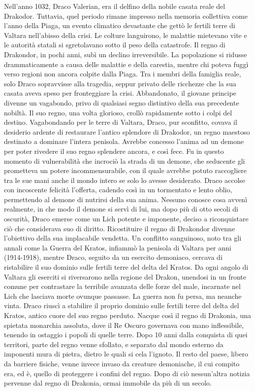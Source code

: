 Nell'anno 1032, Draco Valerian, era il delfino della nobile casata reale
del Drakodor. Tuttavia, quel periodo rimane impresso nella memoria
collettiva come l'anno della Piaga, un evento climatico devastante che
gettò le fertili terre di Valtara nell'abisso della crisi. Le colture
languirono, le malattie mietevano vite e le autorità statali si
sgretolavano sotto il peso della catastrofe. Il regno di Drakondor, in
pochi anni, subì un declino irreversibile. La popolazione si ridusse
drammaticamente a causa delle malattie e della carestia, mentre chi
poteva fuggì verso regioni non ancora colpite dalla Piaga. Tra i membri
della famiglia reale, solo Draco sopravvisse alla tragedia, seppur
privato delle ricchezze che la sua casata aveva speso per fronteggiare
la crisi. Abbandonato, il giovane principe divenne un vagabondo, privo
di qualsiasi segno distintivo della sua precedente nobiltà. Il suo
regno, una volta glorioso, crollò rapidamente sotto i colpi del destino.
Vagabondando per le terre di Valtara, Draco, pur sconfitto, covava il
desiderio ardente di restaurare l'antico splendore di Drakodor, un regno
maestoso destinato a dominare l'intera penisola. Avrebbe concesso
l'anima ad un demone per poter rivedere il suo regno splendere ancora, e
così fece. Fu in questo momento di vulnerabilità che incrociò la strada
di un demone, che seducente gli prometteva un potere incommensurabile,
con il quale avrebbe potuto raccogliere tra le sue mani anche il mondo
intero se solo lo avesse desiderato. Draco accolse con incoscente
felicità l'offerta, cadendo così in un tormentato e lento oblio,
permettendo al demone di nutrirsi della sua anima. Nessuno conosce cosa
avvenì realmente, in che modo il demone si servì di lui, ma dopo più di
otto secoli di oscurità, Draco emerse come un Lich potente e imponente,
deciso a riconquistare ciò che considerava suo di diritto. Ricostituire
il regno di Drakondor divenne l'obiettivo della sua implacabile
vendetta. Un conflitto sanguinoso, noto tra gli annali come la Guerra
del Kratos, infiammò la penisola di Valtara per anni (1914-1918), mentre
Draco, seguito da un esercito demoniaco, cercava di ristabilire il suo
dominio sulle fertili terre del delta del Kratos. Da ogni angolo di
Valtara gli eserciti si riversarono nella regione del Drakon, unendosi
in un fronte comune per contrastare la terribile avanzata delle forze
del male, incarnate nel Lich che lasciava morte ovunque passasse. La
guerra non fu persa, ma neanche vinta. Draco riuscì a stabilire il
proprio dominio sulle fertili terre del delta del Kratos, antico cuore
del suo regno perduto. Nacque così il regno di Drakonia, una spietata
monarchia assoluta, dove il Re Oscuro governava con mano inflessibile,
tenendo in ostaggio i popoli di quelle terre. Dopo 10 anni dalla
conquista di quei territori, parte del regno venne sfollato, e separato
dal mondo esterno da imponenti mura di pietra, dietro le quali si cela
l'ignoto. Il resto del paese, libero da barriere fisiche, venne invece
invaso da creature demoniache, il cui compito era, ed è, quello di
proteggere i confini del regno. Dopo di ciò nessun'altra notizia
pervenne dal regno di Drakonia, ormai immobile da più di un secolo.

